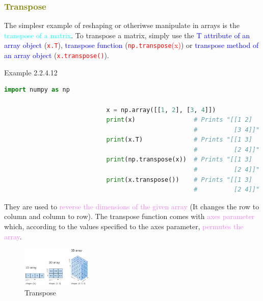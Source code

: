 \documentclass{book}
\begin{document}
\textcolor{olive}{\subsubsection{Transpose}}
The simplesr example of reshaping or otheriwse manipulate in arrays is the \textcolor{cyan}{transpose of a matrix}.
To transpose a matrix, simply use the \textcolor{blue}{T attribute of an array object} (\textcolor{red}{\texttt{x.T}}), \textcolor{blue}{transpose function} (\textcolor{red}{\texttt{np.transpose}(x)}) or \textcolor{blue}{transpose method of an array object} (\textcolor{red}{\texttt{x.transpose()}}).
\begin{egBox}{Example 2.2.4.12}{}
    \begin{lstlisting}[language=Python, basicstyle=\ttfamily\small, keywordstyle=\color{blue}, commentstyle=\color{forestgreen}, stringstyle=\color{red}, showstringspaces=false]
                            import numpy as np

                            x = np.array([[1, 2], [3, 4]])
                            print(x)                # Prints "[[1 2]
                                                    #          [3 4]]"
                            print(x.T)              # Prints "[[1 3]
                                                    #          [2 4]]"
                            print(np.transpose(x))  # Prints "[[1 3]
                                                    #          [2 4]]"
                            print(x.transpose())    # Prints "[[1 3]
                                                    #          [2 4]]"
    \end{lstlisting}
\end{egBox}
They are used to \textcolor{violet}{reverse the dimensions of the given array} (It changes the row to column and column to row).
\newpage
The transpose function comes with \textcolor{violet}{axes parameter} which, according to the values specified to the axes parameter, \textcolor{violet}{permutes the array}.
\begin{figure}
    \centering
    \includegraphics[width = 0.3\textwidth]{chapter 2/ch2_figure5.jpeg}
    \caption{Transpose}
\end{figure}
\end{document}
